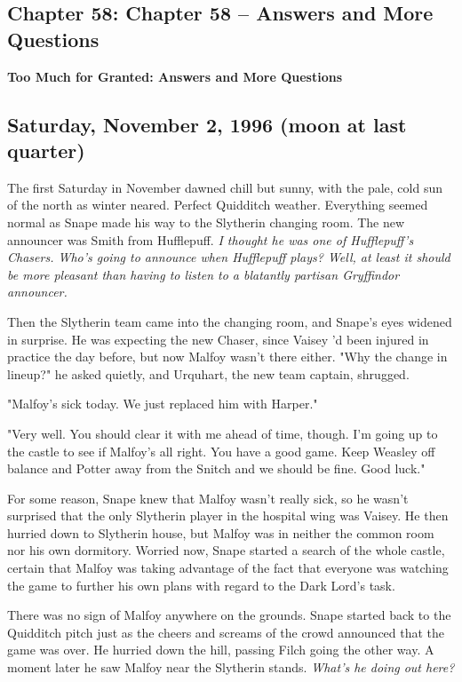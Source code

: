 \documentclass[a4paper,11pt]{article}
\begin{document}
\subsection{Chapter 58: Chapter 58 – Answers and More Questions}

\textbf{Too Much for Granted: Answers and More Questions}

\subsection{Saturday, November 2, 1996 (moon at last quarter)}

The first Saturday in November dawned chill but sunny, with the pale, cold sun of the north as winter neared. Perfect Quidditch weather. Everything seemed normal as Snape made his way to the Slytherin changing room. The new announcer was Smith from Hufflepuff. \emph{I thought he was one of Hufflepuff's Chasers. Who's going to announce when Hufflepuff plays? Well, at least it should be more pleasant than having to listen to a blatantly partisan Gryffindor announcer.}

Then the Slytherin team came into the changing room, and Snape's eyes widened in surprise. He was expecting the new Chaser, since Vaisey 'd been injured in practice the day before, but now Malfoy wasn't there either. "Why the change in lineup?" he asked quietly, and Urquhart, the new team captain, shrugged.

"Malfoy's sick today. We just replaced him with Harper."

"Very well. You should clear it with me ahead of time, though. I'm going up to the castle to see if Malfoy's all right. You have a good game. Keep Weasley off balance and Potter away from the Snitch and we should be fine. Good luck."

For some reason, Snape knew that Malfoy wasn't really sick, so he wasn't surprised that the only Slytherin player in the hospital wing was Vaisey. He then hurried down to Slytherin house, but Malfoy was in neither the common room nor his own dormitory. Worried now, Snape started a search of the whole castle, certain that Malfoy was taking advantage of the fact that everyone was watching the game to further his own plans with regard to the Dark Lord's task.

There was no sign of Malfoy anywhere on the grounds. Snape started back to the Quidditch pitch just as the cheers and screams of the crowd announced that the game was over. He hurried down the hill, passing Filch going the other way. A moment later he saw Malfoy near the Slytherin stands. \emph{What's he doing out here?}
\end{document}

